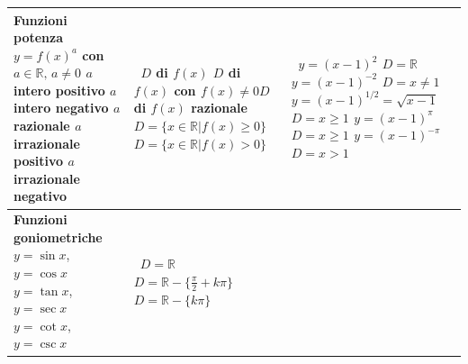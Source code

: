 \begin{tabularx}{\textwidth}{XXX}
  \textbf{Funzioni potenza} \newline \(y=f(x)^a\) \newline con 
\(a\in\mathbb{R},\,a\neq0\) \newline \newline\(a\) intero positivo \newline 
\newline \(a\) intero negativo \newline  \newline \(a\) razionale \newline  
\newline\(a\) irrazionale positivo \newline \newline \(a\) irrazionale negativo 
  & \(\,\)  \newline  \newline  \newline  \newline  \(D\) di \(f(x)\) 
\newline  \newline \(D\) di \(f(x)\) con \(f(x)\neq0\)\newline \newline \(D\) di 
\(f(x)\) razionale \newline \newline \(D=\{x\in\mathbb{R}\vert 
f(x)\geq0\}\)\newline \newline \(D=\{x\in\mathbb{R}\vert f(x)>0\}\)
  & \(\,\)  \newline  \newline  \newline  \newline \(y=(x-1)^2\) 
\(D=\mathbb{R}\) \newline \newline \(y=(x-1)^{-2}\) \(D=x\neq1\) \newline \newline 
\(y=(x-1)^{1/2}=\sqrt{x-1}\) \(D=x\geq1\) \newline \(y=(x-1)^{\pi}\) \(D=x\geq1\) 
\newline \newline \(y=(x-1)^{-\pi}\) \(D=x>1\)\\
  \midrule

  \textbf{Funzioni goniometriche} \newline \(y=\sin{x}\), 
\(y=\cos{x}\) \newline \newline \(y=\tan x\), \(y=\sec x\) \newline  \newline 
\(y=\cot x\), \(y=\csc x\) 
  & \(\,\) \newline \(D=\mathbb{R}\) \newline  \newline 
\(D=\mathbb{R} -\bigl\{\frac{\pi}{2}+k\pi \bigr\}\)\newline \newline 
\(D=\mathbb{R} -\{k\pi\}\)
  &  \\
  \midrule


\end{tabularx}
